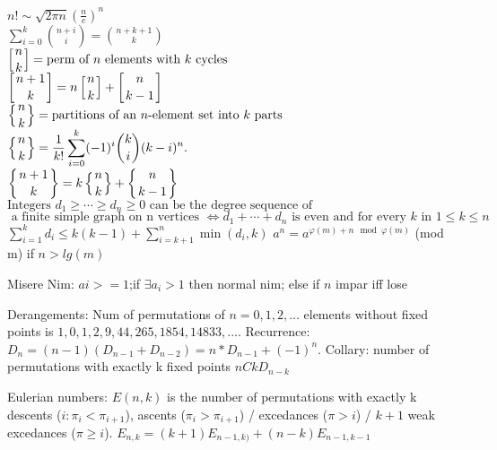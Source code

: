 $\displaystyle n!\sim {\sqrt {2\pi n}}\left({\frac {n}{e}}\right)^{n}$ \\
$\displaystyle \sum \limits_{i= 0}^k{n+i \choose i} = {n+k+1 \choose k}$ \\
${\displaystyle \left[{n \atop k}\right]} =\text{perm of }n \text{ elements with } k \text{ cycles}$ \\
${\displaystyle \left[{n+1 \atop k}\right]=n\left[{n \atop k}\right]+\left[{n \atop k-1}\right]}$ \\
${\displaystyle \left\{{n \atop k}\right\}}= \text{partitions of an }n\text{-element set into } k \text{ parts}$ \\
${\displaystyle \left\{{n \atop k}\right\}={\frac {1}{k!}}\sum _{i=0}^{k}(-1)^{i}{\binom {k}{i}}(k-i)^{n}.}$ \\
${\displaystyle \left\{{n+1 \atop k}\right\}=k\left\{{n \atop k}\right\}+\left\{{n \atop k-1}\right\}}$ \\
$\text {Integers } d_{1}\geq \cdots \geq d_{n} \geq 0 \text { can be the degree sequence of }$ \\
$\text { a finite simple graph on n vertices }\iff d_{1}+\cdots +d_{n} \text { is even and for every } k \text { in } 1\leq k\leq n $ \\
${\displaystyle \sum _{i=1}^{k}d_{i}\leq k(k-1)+\sum _{i=k+1}^{n}\min(d_{i},k)}$
$a^n = a^{\varphi(m)+n \mod \varphi(m)}$ (mod m) if $n > lg(m)$

Misere Nim: $ai>=1$;if $\exists a_i > 1$ then normal nim; else if $n$ impar iff lose

Derangements: Num of permutations of $n=0,1,2,...$ elements without fixed points is
$1,0,1,2,9,44,265,1854,14833,...$. Recurrence: $D_n = (n-1)(D_{n-1}+D_{n-2}) = n*D_{n-1}+(-1)^n$.
Collary: number of permutations with exactly k fixed points $nCk D_{n-k}$

Eulerian numbers: $E(n,k)$ is the number of permutations with exactly k descents ($i:\pi_{i} < \pi_{i+1}$),
ascents ($\pi_i > \pi_{i+1}$) / excedances ($\pi > i$) / $k+1$ weak excedances ($\pi \geq i$).
$E_{n,k} = (k+1)E_{n-1,k)} + (n-k)E_{n-1,k-1}$